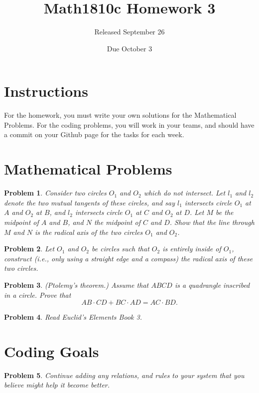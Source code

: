 \documentclass{article}
\title{Math1810c Homework 3}
\author{Released September 26}
\date{Due October 3}
\newtheorem{problem}{Problem}
\begin{document}
\maketitle

\section{Instructions}

For the homework, you must write your own solutions for the Mathematical Problems. For the coding problems, you will work in your teams, and should have a commit on your Github page for the tasks for each week. 

\section{Mathematical Problems}

\begin{problem}
    Consider two circles $O_1$ and $O_2$ which do not intersect. Let $l_1$ and $l_2$ denote the two mutual tangents of these circles, and say $l_1$ intersects circle $O_1$ at $A$ and $O_2$ at $B$, and $l_2$ intersects circle $O_1$ at $C$ and $O_2$ at $D$. Let $M$ be the midpoint of $A$ and $B$, and $N$ the midpoint of $C$ and $D$. Show that the line through $M$ and $N$ is the radical axis of the two circles $O_1$ and $O_2$.
\end{problem}

\begin{problem}
    Let $O_1$ and $O_2$ be circles such that $O_2$ is entirely inside of $O_1$, construct (i.e., only using a straight edge and a compass) the radical axis of these two circles.
\end{problem}

\begin{problem}
   (Ptolemy's theorem.) Assume that $ABCD$ is a quadrangle inscribed in a circle. Prove that
\[
AB\cdot CD + BC \cdot AD = AC \cdot BD.
\]
\end{problem}

\begin{problem}
    Read Euclid's Elements Book 3.
\end{problem}

\newpage

\section{Coding Goals}

\begin{problem}
    Continue adding any relations, and rules to your system that you believe might help it become better.
\end{problem}
\end{document}
